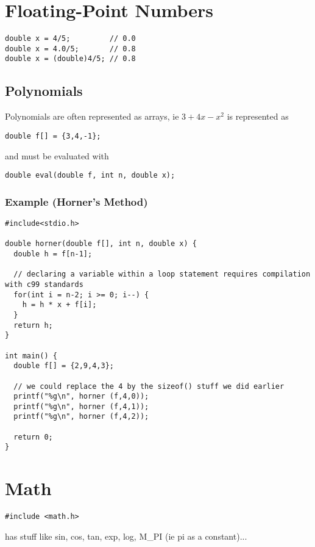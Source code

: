 \documentclass[12pt]{article}
\begin{document}
\section*{Floating-Point Numbers}
\begin{verbatim}
double x = 4/5;         // 0.0
double x = 4.0/5;       // 0.8
double x = (double)4/5; // 0.8
\end{verbatim}

\subsection*{Polynomials}
Polynomials are often represented as arrays, ie $3 + 4x - x^2$ is represented as \begin{verbatim}double f[] = {3,4,-1};\end{verbatim} and must be evaluated with \begin{verbatim}double eval(double f, int n, double x);\end{verbatim}

\subsubsection*{Example (Horner's Method)}
\begin{verbatim}
#include<stdio.h>

double horner(double f[], int n, double x) {
  double h = f[n-1];

  // declaring a variable within a loop statement requires compilation with c99 standards
  for(int i = n-2; i >= 0; i--) {
    h = h * x + f[i];
  }
  return h;
}

int main() {
  double f[] = {2,9,4,3};

  // we could replace the 4 by the sizeof() stuff we did earlier
  printf("%g\n", horner (f,4,0));
  printf("%g\n", horner (f,4,1));
  printf("%g\n", horner (f,4,2));

  return 0;
}
\end{verbatim}

\section*{Math}
\begin{verbatim}#include <math.h>\end{verbatim} has stuff like sin, cos, tan, exp, log, M\_PI (ie pi as a constant)...
\end{document}
